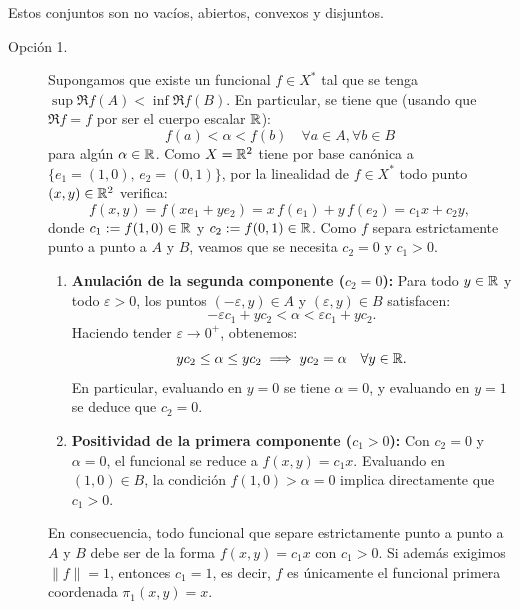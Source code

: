\begin{ejercicio}
    Estos conjuntos son no vacíos, abiertos, convexos y disjuntos.
    \begin{description}
        \item[Opción 1.] Supongamos que existe un funcional $f \in X^*$ tal que se tenga $\sup \Re f(A) < \inf \Re f(B)$. En particular, se tiene que (usando que $\Re f = f$ por ser el cuerpo escalar $\mathbb{R}$):
        \begin{equation*}
            f(a) < \alpha < f(b) \quad \forall a \in A, \forall b \in B
        \end{equation*}
        para algún $\alpha \in \mathbb{R}$. Como $X = \mathbb{R}^2$ tiene por base canónica a $\{e_1 = (1,0),\, e_2 = (0,1)\}$, por la linealidad de $f \in X^*$ todo punto $(x,y) \in \mathbb{R}^2$ verifica:
        \[
            f(x, y) = f(x e_1 + y e_2) = x\,f(e_1) + y\,f(e_2) = c_1 x + c_2 y,
        \]
        donde $c_1 := f(1, 0) \in \mathbb{R}$ y $c_2 := f(0, 1) \in \mathbb{R}$. Como $f$ separa estrictamente punto a punto a $A$ y $B$, veamos que se necesita $c_2 = 0$ y $c_1 > 0$.
        \begin{enumerate}
            \item \textbf{Anulación de la segunda componente ($c_2 = 0$):} Para todo $y \in \mathbb{R}$ y todo $\varepsilon > 0$, los puntos $(-\varepsilon, y) \in A$ y $(\varepsilon, y) \in B$ satisfacen:
            \[
                -\varepsilon c_1 + y c_2 < \alpha < \varepsilon c_1 + y c_2.
            \]
            Haciendo tender $\varepsilon \to 0^+$, obtenemos:
            \[
                y c_2 \leq \alpha \leq y c_2 \implies y c_2 = \alpha \quad \forall y \in \mathbb{R}.
            \]
            En particular, evaluando en $y = 0$ se tiene $\alpha = 0$, y evaluando en $y = 1$ se deduce que $c_2 = 0$.

            \item \textbf{Positividad de la primera componente ($c_1 > 0$):} Con $c_2 = 0$ y $\alpha = 0$, el funcional se reduce a $f(x, y) = c_1 x$. Evaluando en $(1, 0) \in B$, la condición $f(1, 0) > \alpha = 0$ implica directamente que $c_1 > 0$.
        \end{enumerate}

        En consecuencia, todo funcional que separe estrictamente punto a punto a $A$ y $B$ debe ser de la forma $f(x, y) = c_1 x$ con $c_1 > 0$. Si además exigimos $\|f\| = 1$, entonces $c_1 = 1$, es decir, $f$ es únicamente el funcional primera coordenada $\pi_1(x, y) = x$.


\end{description}
\end{ejercicio}
